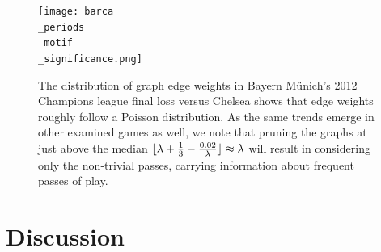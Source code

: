 \documentclass[9pt,twocolumn,twoside]{pnas-report}
\DeclarePairedDelimiter\floor{\lfloor}{\rfloor}
\begin{document}
\begin{figure}[t]\centering
	\texttt{[image: barca\\\_periods\\\_motif\\\_significance.png]}
	\caption{The distribution of graph edge weights in Bayern Münich's 2012 Champions league final loss versus Chelsea shows that edge weights roughly follow a Poisson distribution. As the same trends emerge in other examined games as well, we note that pruning the graphs at just above the median $\floor{\lambda + \frac{1}{3} - \frac{0.02}{\lambda}} \approx \lambda$ will result in considering only the non-trivial passes, carrying information about frequent passes of play.}
	\label{fig:Barca Significance}
\end{figure}




\section*{Discussion}
\end{document}
